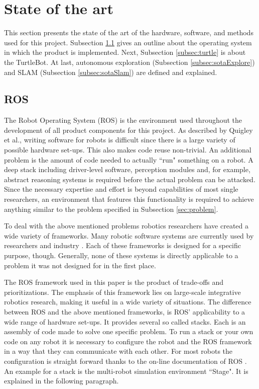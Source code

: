 \documentclass{ba-kecs}
\begin{document}
\section{State of the art}
This section presents the state of the art of the hardware, software, and methods used for this project. Subsection \ref{subsec:ros} gives an outline about the operating system in which the product is implemented. Next, Subsection \ref{subsec:turtle} is about the TurtleBot. At last, autonomous exploration (Subsection \ref{subsec:sotaExplore}) and SLAM (Subsection \ref{subsec:sotaSlam}) 
\label{sec:sota} are defined and explained.
\subsection{ROS}
\label{subsec:ros}
The Robot Operating System (ROS) \cite{Quigley} is the environment used throughout the development of all product components for this project. As described by Quigley et al., writing software for robots is difficult since there is a large variety of possible hardware set-ups. This also makes code reuse non-trivial. An additional problem is the amount of code needed to actually ``run" something on a robot. A deep stack including driver-level software, perception modules and, for example, abstract reasoning systems is required before the actual problem can be attacked. Since the necessary expertise and effort is beyond capabilities of most single researchers, an environment that features this functionality is required to achieve anything similar to the problem specified in Subsection \ref{sec:problem}.

To deal with the above mentioned problems robotics researchers have created a wide variety of frameworks. Many robotic software systems are currently used by researchers and industry \cite{Kramer}. Each of these frameworks is designed for a specific purpose, though. Generally, none of these systems is directly applicable to a problem it was not designed for in the first place.

The ROS framework used in this paper is the product of trade-offs and prioritizations. The emphasis of this framework lies on large-scale integrative robotics research, making it useful in a wide variety of situations. The difference between ROS and the above mentioned frameworks, is ROS' applicability to a wide range of hardware set-ups. It provides several so called stacks. Each is an assembly of code made to solve one specific problem. To run a stack or your own code on any robot it is necessary to configure the robot and the ROS framework in a way that they can communicate with each other. For most robots the configuration is straight forward thanks to the on-line documentation of ROS \citep{Roswiki}.  An example for a stack is the multi-robot simulation environment ``Stage". It is explained in the following paragraph.
\end{document}
